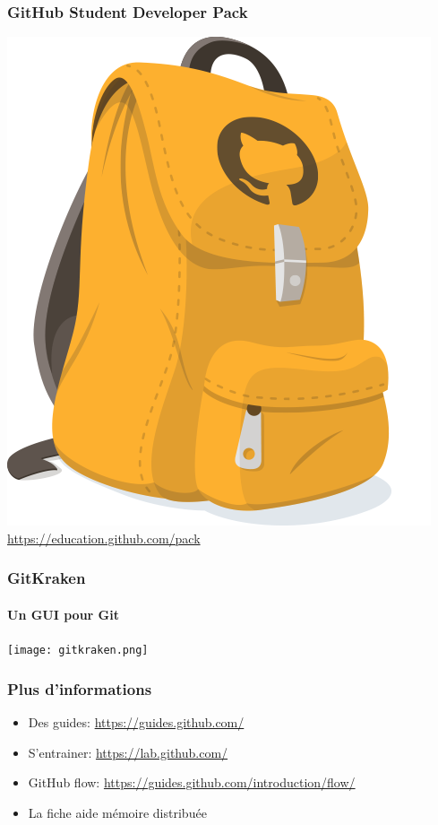 \documentclass[aspectratio=169]{beamer}
\begin{document}
\begin{frame}
  \frametitle{GitHub Student Developer Pack}
  \centering
  \includegraphics[height=0.5\paperheight]{student-dev-pack.png}\\
  \url{https://education.github.com/pack}
\end{frame}

\begin{frame}
  \frametitle{GitKraken}
  \framesubtitle{Un GUI pour Git}
  \centering
  \texttt{[image: gitkraken.png]}
\end{frame}

\begin{frame}
  \frametitle{Plus d'informations}
  \begin{itemize}
    \item Des guides: \url{https://guides.github.com/}
    \item S'entrainer: \url{https://lab.github.com/}
    \item GitHub flow: \url{https://guides.github.com/introduction/flow/}
    \item La fiche aide mémoire distribuée
  \end{itemize}
\end{frame}
\end{document}
